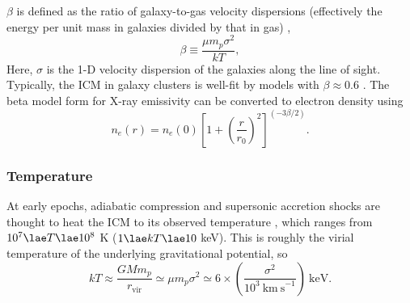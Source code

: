 $\beta$ is defined as the ratio of galaxy-to-gas velocity dispersions (effectively  the energy per unit mass in galaxies divided by that in gas)
, 
\begin{equation} \beta \equiv \frac{\mu m_p \sigma^2}{kT}, \end{equation}
Here, $\sigma$ is the 1-D velocity dispersion of the galaxies along the line of sight.  
Typically, the ICM in galaxy clusters is well-fit by models with
$\beta\approx0.6$ \citep{sarazin86}. 
The beta model form for X-ray emissivity can be converted to electron density using 
\begin{equation}
n_e\left(r\right) =
n_e\left(0\right) \left[ 1 + \left(\frac{r}{r_0}\right)^2\right]^{\left(-3\beta / 2\right)}. 
\end{equation}





\subsubsection{{\bf Temperature}}


At early epochs, adiabatic compression and supersonic accretion shocks are thought to heat the ICM to its 
observed temperature \citep{kaiser86}, which ranges from $10^7 \lae T \lae 10^8$ K ($1 \lae kT \lae 10$ keV). This is  
roughly the virial temperature of the underlying gravitational potential, so 
\begin{equation}
kT \approx \frac{GM m_p}{r_\mathrm{vir}} \simeq \mu m_p \sigma^2 \simeq 6 \times \left( \frac{\sigma^2}{10^3~\mathrm{km~s}^{-1}}  \right)~\mathrm{keV} .  
\label{equation:temp}
\end{equation} 
 


